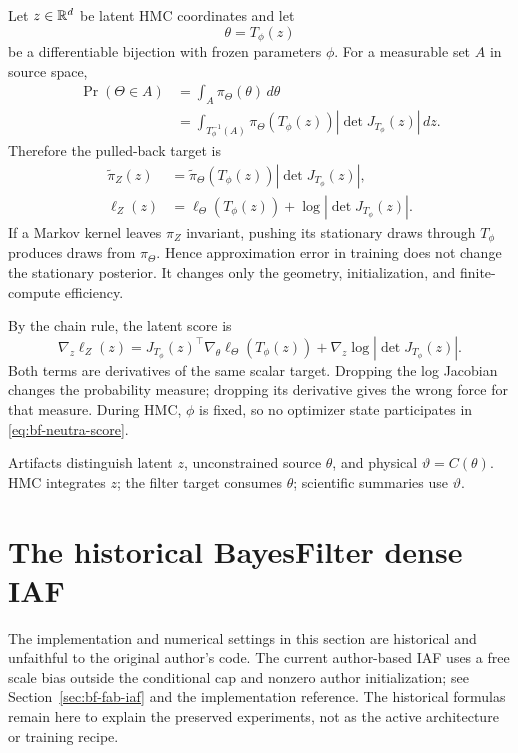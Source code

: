 Let $z\in\mathbb{R}^d$ be latent HMC coordinates and let
\begin{equation}
 \theta=T_\phi(z)
 \label{eq:bf-neutra-map}
\end{equation}
be a differentiable bijection with frozen parameters $\phi$.  For a measurable
set $A$ in source space,
\begin{align}
 \Pr(\Theta\in A)
 &=\int_A\pi_\Theta(\theta)\,d\theta\\
 &=\int_{T_\phi^{-1}(A)}
   \pi_\Theta(T_\phi(z))|\det J_{T_\phi}(z)|\,dz.
\end{align}
Therefore the pulled-back target is
\begin{align}
 \widetilde\pi_Z(z)
 &=\widetilde\pi_\Theta(T_\phi(z))
   |\det J_{T_\phi}(z)|,\\
 \ell_Z(z)&=\ell_\Theta(T_\phi(z))+\log|\det J_{T_\phi}(z)|.
 \label{eq:bf-neutra-transported-target}
\end{align}
If a Markov kernel leaves $\pi_Z$ invariant, pushing its stationary draws
through $T_\phi$ produces draws from $\pi_\Theta$.  Hence approximation error
in training does not change the stationary posterior.  It changes only the
geometry, initialization, and finite-compute efficiency.

By the chain rule, the latent score is
\begin{equation}
 \nabla_z\ell_Z(z)=J_{T_\phi}(z)^\top
 \nabla_\theta\ell_\Theta(T_\phi(z))+
 \nabla_z\log|\det J_{T_\phi}(z)|.
 \label{eq:bf-neutra-score}
\end{equation}
Both terms are derivatives of the same scalar target.  Dropping the log
Jacobian changes the probability measure; dropping its derivative gives the
wrong force for that measure.  During HMC, $\phi$ is fixed, so no optimizer
state participates in \eqref{eq:bf-neutra-score}.

Artifacts distinguish latent $z$, unconstrained source $\theta$, and physical
$\vartheta=C(\theta)$.  HMC integrates $z$; the filter target consumes $\theta$;
scientific summaries use $\vartheta$.

\section{The historical BayesFilter dense IAF}
\label{sec:bf-neutra-iaf}

The implementation and numerical settings in this section are historical and
unfaithful to the original author's code. The current author-based IAF uses a
free scale bias outside the conditional cap and nonzero author initialization;
see Section~\ref{sec:bf-fab-iaf} and the implementation reference. The historical
formulas remain here to explain the preserved experiments, not as the active
architecture or training recipe.

